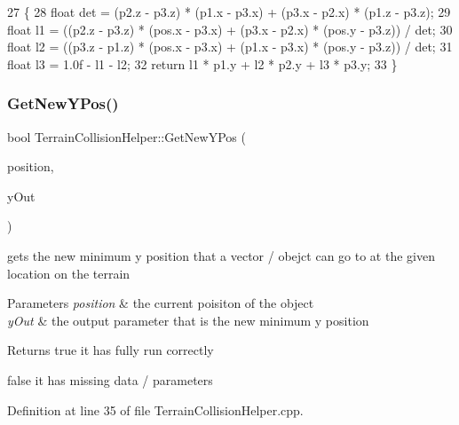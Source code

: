 \begin{DoxyCode}
27                                                                             \{
28         \textcolor{keywordtype}{float} det = (p2.z - p3.z) * (p1.x - p3.x) + (p3.x - p2.x) * (p1.z - p3.z);
29         \textcolor{keywordtype}{float} l1 = ((p2.z - p3.z) * (pos.x - p3.x) + (p3.x - p2.x) * (pos.y - p3.z)) / det;
30         \textcolor{keywordtype}{float} l2 = ((p3.z - p1.z) * (pos.x - p3.x) + (p1.x - p3.x) * (pos.y - p3.z)) / det;
31         \textcolor{keywordtype}{float} l3 = 1.0f - l1 - l2;
32         \textcolor{keywordflow}{return} l1 * p1.y + l2 * p2.y + l3 * p3.y;
33     \}
\end{DoxyCode}
\mbox{\label{class_terrain_collision_helper_a598c308135618bd2a1d5653be8d3b3d0}} 
\subsubsection{\texorpdfstring{Get\+New\+Y\+Pos()}{GetNewYPos()}}
{\footnotesize\ttfamily bool Terrain\+Collision\+Helper\+::\+Get\+New\+Y\+Pos (\begin{DoxyParamCaption}\item[{X\+M\+F\+L\+O\+A\+T3}]{position,  }\item[{float $\ast$}]{y\+Out }\end{DoxyParamCaption})}



gets the new minimum y position that a vector / obejct can go to at the given location on the terrain 


\begin{DoxyParams}{Parameters}
{\em position} & the current poisiton of the object \\
\hline
{\em y\+Out} & the output parameter that is the new minimum y position \\
\hline
\end{DoxyParams}
\begin{DoxyReturn}{Returns}
true it has fully run correctly 

false it has missing data / parameters 
\end{DoxyReturn}


Definition at line 35 of file Terrain\+Collision\+Helper.\+cpp.


